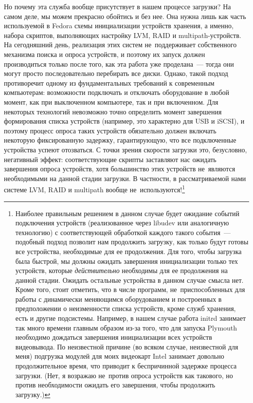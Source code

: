\documentclass[10pt,oneside,a4paper]{article}
\begin{document}
Но почему эта служба вообще присутствует в нашем процессе загрузки? На самом
деле, мы можем прекрасно обойтись и без нее. Она нужна лишь как часть
используемой в Fedora схемы инициализации устройств хранения, а именно, набора
скриптов, выполняющих настройку LVM, RAID и multipath-устройств. На сегодняшний
день, реализация этих систем не~поддерживает собственного механизма поиска и
опроса устройств, и поэтому их запуск должен производиться только после того,
как эта работа уже проделана~--- тогда они могут просто последовательно
перебирать все диски. Однако, такой подход противоречит одному из
фундаментальных требований к современным компьютерам: возможности подключать и
отключать оборудование в любой момент, как при выключенном компьютере, так и при
включенном. Для некоторых технологий невозможно точно определить момент
завершения формирования списка устройств (например, это характерно для USB и
iSCSI), и поэтому процесс опроса таких устройств обязательно должен включать
некоторую фиксированную задержку, гарантирующую, что все подключенные устройства
успеют отозваться. С точки зрения скорости загрузки это, безусловно, негативный
эффект: соответствующие скрипты заставляют нас ожидать завершения опроса
устройств, хотя большинство этих устройств не~являются необходимыми на данной
стадии загрузки. В частности, в рассматриваемой нами системе LVM, RAID и
multipath вообще не~используются!\footnote{Наиболее правильным решением в данном
случае будет ожидание событий подключения устройств (реализованное через libudev
или аналогичную технологию) с соответствующей обработкой каждого такого
события~--- подобный подход позволит нам продолжить загрузку, как только будут
готовы все устройства, необходимые для ее продолжения. Для того, чтобы загрузка
была быстрой, мы должны ожидать завершения инициализации только тех устройств,
которые \emph{действительно} необходимы для ее продолжения на данной стадии.
Ожидать остальные устройства в данном случае смысла нет. Кроме того, стоит
отметить, что в числе программ, не~приспособленных для работы с динамически
меняющимся оборудованием и построенных в предположении о неизменности списка
устройств, кроме служб хранения, есть и другие подсистемы. Например, в нашем
случае работа initrd занимает так много времени главным образом из-за того, что
для запуска Plymouth необходимо дождаться завершения инициализации всех
устройств видеовывода. По неизвестной причине (во всяком случае, неизвестной для
меня) подгрузка модулей для моих видеокарт Intel занимает довольно
продолжительное время, что приводит к беспричинной задержке процесса загрузки.
(Нет, я возражаю не~против опроса устройств как такового, но против
необходимости ожидать его завершения, чтобы продолжить загрузку.)}
\end{document}
